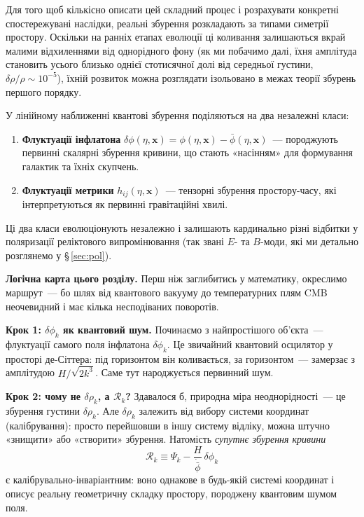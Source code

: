 Для того щоб кількісно описати цей складний процес і розрахувати конкретні
спостережувані наслідки, реальні збурення розкладають за типами симетрії
простору. Оскільки на ранніх етапах еволюції ці коливання залишаються вкрай
малими відхиленнями від однорідного фону (як ми побачимо далі, їхня амплітуда
становить усього близько однієї стотисячної долі від середньої густини,
$\delta\rho/\rho \sim 10^{-5}$), їхній розвиток можна розглядати ізольовано
в межах теорії збурень першого порядку.

У лінійному наближенні квантові збурення поділяються на два незалежні класи:
\begin{enumerate}
  \item \textbf{Флуктуації інфлатона} $\delta\phi(\eta, \mathbf{x}) = \phi(\eta, \mathbf{x}) - \bar{\phi}(\eta, \mathbf{x})$~---
        породжують первинні скалярні збурення кривини, що стають
        «насінням» для формування галактик та їхніх скупчень.
  \item \textbf{Флуктуації метрики} $h_{ij}(\eta, \mathbf{x})$~---
        тензорні збурення простору-часу, які інтерпретуються як первинні
        гравітаційні хвилі.
\end{enumerate}
Ці два класи еволюціонують незалежно і залишають кардинально різні відбитки
у поляризації реліктового випромінювання (так звані $E$- та $B$-моди, які ми
детально розглянемо у §\,\ref{sec:pol}).

\bigskip
\noindent\textbf{Логічна карта цього розділу.}
Перш ніж заглибитись у математику, окреслимо маршрут~---
бо шлях від квантового вакууму до температурних плям CMB
неочевидний і має кілька несподіваних поворотів.

\medskip
\noindent\textbf{Крок 1: $\delta\phi_k$ як квантовий шум.}
Починаємо з найпростішого об'єкта~--- флуктуації самого поля
інфлатона $\delta\phi_k$. Це звичайний квантовий осцилятор у
просторі де-Сіттера: під горизонтом він коливається, за
горизонтом~--- замерзає з амплітудою $H/\sqrt{2k^3}$.
Саме тут народжується первинний шум.

\medskip
\noindent\textbf{Крок 2: чому не $\delta\rho_k$, а $\mathcal{R}_k$?}
Здавалося б, природна міра неоднорідності~--- це збурення
густини $\delta\rho_k$. Але $\delta\rho_k$ залежить від вибору
системи координат (калібрування): просто перейшовши в іншу
систему відліку, можна штучно «знищити» або «створити» збурення.
Натомість \emph{супутнє збурення кривини}
\begin{equation*}
  \mathcal{R}_k \equiv \Psi_k - \frac{H}{\dot{\bar\phi}}\,\delta\phi_k
\end{equation*}
є калібрувально-інваріантним: воно однакове в будь-якій системі
координат і описує реальну геометричну складку простору,
породжену квантовим шумом поля.

